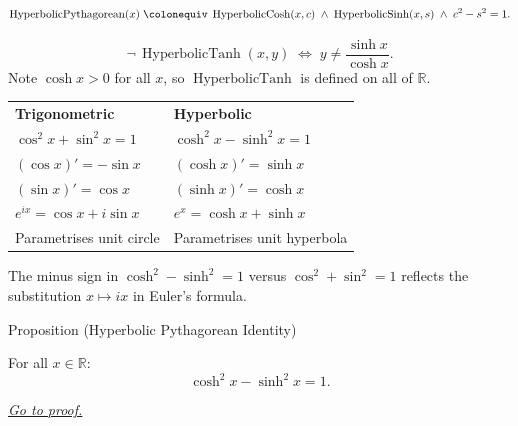\begin{remark*}
\[
  \operatorname{HyperbolicPythagorean}(x)
  \;\colonequiv\;
  \operatorname{HyperbolicCosh}(x,c)
  \;\wedge\; \operatorname{HyperbolicSinh}(x,s)
  \;\wedge\; c^2 - s^2 = 1.
\]
\end{remark*}

\begin{remark*}
\[
  \neg\,\operatorname{HyperbolicTanh}(x,y)
  \;\iff\;
  y \neq \frac{\sinh x}{\cosh x}.
\]
Note $\cosh x > 0$ for all $x$, so $\operatorname{HyperbolicTanh}$
is defined on all of $\mathbb{R}$.
\end{remark*}

\begin{remark*}
\begin{center}
\begin{tabular}{@{}ll@{}}
\textbf{Trigonometric} & \textbf{Hyperbolic} \\
$\cos^2 x + \sin^2 x = 1$ & $\cosh^2 x - \sinh^2 x = 1$ \\
$(\cos x)' = -\sin x$ & $(\cosh x)' = \sinh x$ \\
$(\sin x)' = \cos x$ & $(\sinh x)' = \cosh x$ \\
$e^{ix} = \cos x + i\sin x$ & $e^x = \cosh x + \sinh x$ \\
Parametrises unit circle & Parametrises unit hyperbola \\
\end{tabular}
\end{center}
The minus sign in $\cosh^2 - \sinh^2 = 1$ versus $\cos^2 + \sin^2 =
1$ reflects the substitution $x \mapsto ix$ in Euler's formula.
\end{remark*}


\begin{propositionbox}{Proposition (Hyperbolic Pythagorean Identity)}
\begin{proposition}
\label{prop:hyperbolic-pythagorean}
For all $x \in \mathbb{R}$:
\[
  \cosh^2 x - \sinh^2 x = 1.
\]

\smallskip\noindent
\hyperref[prf:hyperbolic-pythagorean]{\textit{Go to proof.}}
\end{proposition}
\end{propositionbox}

